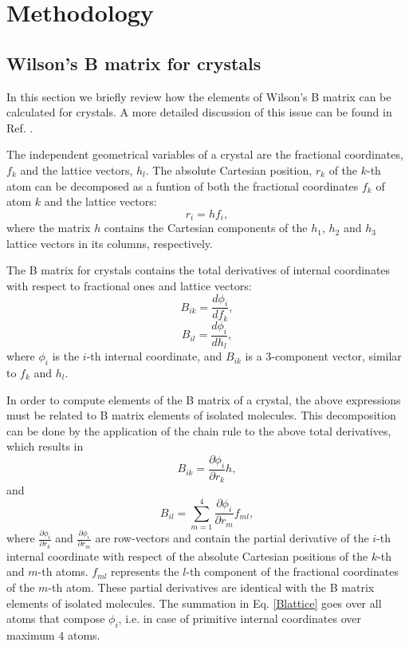 \documentclass[prl,aps,preprint,superbib,12pt]{revtex4}
\begin{document}
\section{Methodology}
\subsection{Wilson's B matrix for crystals}
In this section we briefly review how the elements of Wilson's
B matrix can be calculated for crystals. A more detailed discussion 
of this issue can be found in Ref. .

The independent geometrical variables of a crystal are the 
fractional coordinates, $f_{k}$ and the lattice vectors, $h_{l}$.
The absolute Cartesian position, $r_{k}$ of the $k$-th atom
can be decomposed as a funtion of both the fractional coordinates 
$f_{k}$ of atom $k$ and the lattice vectors:
\begin{equation}
r_{i} = h f_{i} ,
\end{equation}
where the matrix $h$ contains the Cartesian components of the 
$h_{1}$, $h_{2}$ and $h_{3}$ lattice vectors in its 
columns, respectively.

The B matrix for crystals contains the total derivatives 
of internal coordinates with respect to fractional ones
and lattice vectors:
\begin{equation}
B_{ik} = \frac{d \phi_{i}}{d f_{k}} ,
\end{equation}
\begin{equation}
B_{il} = \frac{d \phi_{i}}{d h_{l}} ,
\end{equation}
where $\phi_{i}$ is the $i$-th internal coordinate,
and $B_{ik}$ is a 3-component vector, similar to $f_{k}$ and $h_{l}$.

In order to compute elements of the B matrix of a crystal, the above
expressions must be
related to B matrix elements of isolated molecules. This decomposition
can be done by the application of the chain rule to the above 
total derivatives, which results in
\begin{equation}
B_{ik} =  \frac{\partial \phi_{i}}{\partial r_{k}} h ,
\end{equation}
and 
\begin{equation} \label{Blattice}
B_{il} =  \sum_{m=1}^{4} 
          \frac{\partial \phi_{i}}{\partial r_{m}} f_{ml},
\end{equation}
where $\frac{\partial \phi_{i}}{\partial r_{k}}$ and 
$\frac{\partial \phi_{i}}{\partial r_{m}}$ are row-vectors and contain
the partial derivative of the $i$-th internal coordinate
with respect of the absolute Cartesian positions of 
the $k$-th and $m$-th atoms. $f_{ml}$ represents the
$l$-th component of the fractional coordinates of the $m$-th atom.
These partial derivatives are identical
with the B matrix elements of isolated molecules. The summation
in Eq. \ref{Blattice} goes over all atoms that compose $\phi_{i}$,
i.e. in case of primitive internal coordinates over maximum $4$ atoms. 
\end{document}
